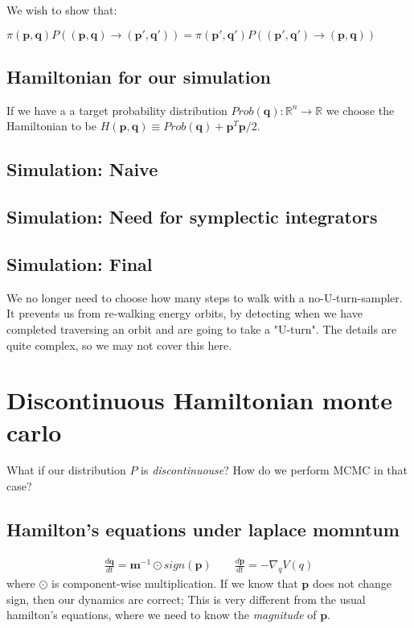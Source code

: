 \documentclass[titlepage]{article}
\newcommand{\R}{\mathbb{R}}
\newcommand{\p}{\mathbf{p}}
\newcommand{\q}{\mathbf{q}}
\newcommand{\m}{\mathbf{m}}
\begin{document}
We wish to show that:

$\pi(\p, \q) P((\p, \q) \rightarrow (\p', \q')) = \pi(\p', \q') P((\p', \q') \rightarrow (\p, \q))$


\subsection{Hamiltonian for our simulation}
If we have a a target probability distribution $Prob(\q): \R^n \rightarrow \R$
we choose the Hamiltonian to be $H(\p, \q) \equiv Prob(\q) + \p^T \p/2$.


\subsection{Simulation: Naive}
\subsection{Simulation: Need for symplectic integrators}
\subsection{Simulation: Final}


We no longer need to choose how many steps to walk with a no-U-turn-sampler.
It prevents us from re-walking energy orbits, by detecting when we have completed
traversing an orbit and are going to take a "U-turn". The details are quite
complex, so we may not cover this here.

\section{Discontinuous Hamiltonian monte carlo}

What if our distribution $P$ is \emph{discontinuouse}? How do we perform MCMC
in that case?

\subsection{Hamilton's equations under laplace momntum}

\begin{align*}
    \frac{d \q}{dt} = \m^{-1} \odot sign(\p) \qquad \frac{d \p}{dt} = - \nabla_q V(q)
\end{align*}
where $\odot$ is component-wise multiplication. If we know that $\p$ does
not change sign, then our dynamics are correct; This is very different from
the usual hamilton's equations, where we need to know the \emph{magnitude}
of $\p$.
\end{document}
